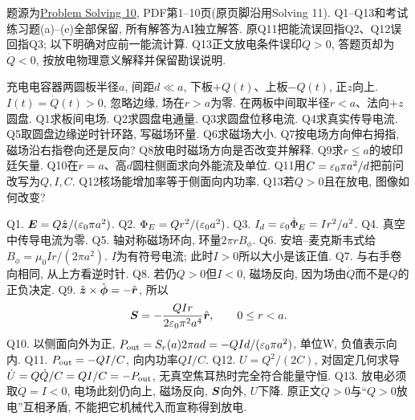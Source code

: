 题源为\href{https://ocw.mit.edu/courses/8-02-physics-ii-electricity-and-magnetism-spring-2007/resources/solving10/}{Problem Solving 10}, PDF第1--10页(原页脚沿用Solving 11). Q1--Q13和考试练习题(a)--(e)全部保留, 所有解答为AI独立解答. 原Q11把能流误回指Q2、Q12误回指Q3; 以下明确对应前一能流计算. Q13正文放电条件误印$\dot Q>0$, 答题页却为$\dot Q<0$, 按放电物理意义解释并保留勘误说明.

\begin{exercise}
充电电容器两圆板半径$a$, 间距$d\ll a$, 下板$+Q(t)$、上板$-Q(t)$, 正$z$向上. $I(t)=\dot Q(t)>0$, 忽略边缘, 场在$r>a$为零. 在两板中间取半径$r<a$、法向$+z$圆盘.
Q1求板间电场.
Q2求圆盘电通量.
Q3求圆盘位移电流.
Q4求真实传导电流.
Q5取圆盘边缘逆时针环路, 写磁场环量.
Q6求磁场大小.
Q7按电场方向伸右拇指, 磁场沿右指卷向还是反向?
Q8放电时磁场方向是否改变并解释.
Q9求$r\le a$的坡印廷矢量.
Q10在$r=a$、高$d$圆柱侧面求向外能流及单位.
Q11用$C=\varepsilon_0\pi a^2/d$把前问改写为$Q,I,C$.
Q12核场能增加率等于侧面向内功率.
Q13若$Q>0$且在放电, 图像如何改变?
\end{exercise}
\begin{solution}
Q1. $\boldsymbol{E}=Q\hat{\boldsymbol{z}}/(\varepsilon_0\pi a^2)$.
Q2. $\Phi_E=Q r^2/(\varepsilon_0 a^2)$.
Q3. $I_d=\varepsilon_0\dot\Phi_E=I r^2/a^2$.
Q4. 真空中传导电流为零.
Q5. 轴对称磁场环向, 环量$2\pi rB_\phi$.
Q6. 安培--麦克斯韦式给$B_\phi=\mu_0Ir/(2\pi a^2)$. $I$为有符号电流; 此时$I>0$所以大小是该正值.
Q7. 与右手卷向相同, 从上方看逆时针.
Q8. 若仍$Q>0$但$I<0$, 磁场反向, 因为场由$\dot Q$而不是$Q$的正负决定.
Q9. $\hat{\boldsymbol{z}}\times\hat{\boldsymbol{\phi}}=-\hat{\boldsymbol{r}}$, 所以
\[
\boldsymbol{S}=-\frac{QIr}{2\varepsilon_0\pi^2a^4}\hat{\boldsymbol{r}},\qquad 0\le r<a.
\]
Q10. 以侧面向外为正, $P_{\rm out}=S_r(a)2\pi ad=-QId/(\varepsilon_0\pi a^2)$, 单位W, 负值表示向内.
Q11. $P_{\rm out}=-QI/C$, 向内功率$QI/C$.
Q12. $U=Q^2/(2C)$, 对固定几何求导$\dot U=Q\dot Q/C=QI/C=-P_{\rm out}$, 无真空焦耳热时完全符合能量守恒.
Q13. 放电必须取$\dot Q=I<0$, 电场此刻仍向上, 磁场反向, $\boldsymbol{S}$向外, $U$下降. 原正文$\dot Q>0$与“$Q>0$放电”互相矛盾, 不能把它机械代入而宣称得到放电.
\end{solution}

